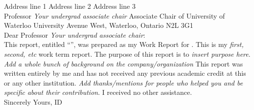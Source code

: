 {
\noindent
Address line 1\newline
Address line 2\newline
Address line 3\newline
\dateofsubmittal{}\\

\noindent
Professor \textit{Your undergrad associate chair}\newline
Associate Chair of \yourdiscipline\newline
\department\newline
University of Waterloo University Avenue West,\newline
Waterloo, Ontario\newline
N2L 3G1\\

\noindent
Dear Professor \textit{Your undergrad associate chair}:\\

\noindent
This report, entitled “\reporttitle”, was prepared as my \academicterm Work Report for \yourorganization. This is my \textit{first, second, etc} work term report. The purpose of this report is to \textit{insert purpose here}. \textit{Add a whole bunch of background on the company/organization} This report was written entirely by me and has not received any previous academic credit at this or any other institution. \textit{Add thanks/mentions for people who helped you and be specific about their contribution}. I received no other assistance.\\

\noindent Sincerely Yours,\bigbreak\bigbreak\bigbreak\bigbreak
\noindent\yourname\newline
ID \youridnumber
\par}
